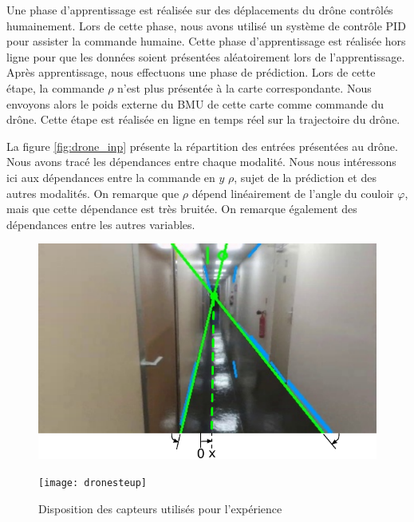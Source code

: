 \documentclass[../main]{subfiles}
\begin{document}
Une phase d'apprentissage est réalisée sur des déplacements du drône contrôlés humainement. Lors de cette phase, nous avons utilisé un système de contrôle PID pour assister la commande humaine.
Cette phase d'apprentissage est réalisée hors ligne pour que les données soient présentées aléatoirement lors de l'apprentissage.
Après apprentissage, nous effectuons une phase de prédiction. Lors de cette étape, la commande $\rho$ n'est plus présentée à la carte correspondante. 
Nous envoyons alors le poids externe du BMU de cette carte comme commande du drône. Cette étape est réalisée en ligne en temps réel sur la trajectoire du drône.

La figure \ref{fig:drone_inp} présente la répartition des entrées présentées au drône. Nous avons tracé les dépendances entre chaque modalité. Nous nous intéressons ici aux dépendances entre la commande en $y$ $\rho$, sujet de la prédiction et des autres modalités.
On remarque que $\rho$ dépend linéairement de l'angle du couloir $\varphi$, mais que cette dépendance est très bruitée. On remarque également des dépendances entre les autres variables.

\begin{figure}
	\begin{minipage}{0.5\textwidth}
	\includegraphics[width=\textwidth]{visudrone}
	\end{minipage}
	\begin{minipage}{0.5\textwidth}
	\texttt{[image: dronesteup]}
	\end{minipage}
	\caption{Disposition des capteurs utilisés pour l'expérience}
	\label{fig:drone}
	\end{figure}


\end{document}
